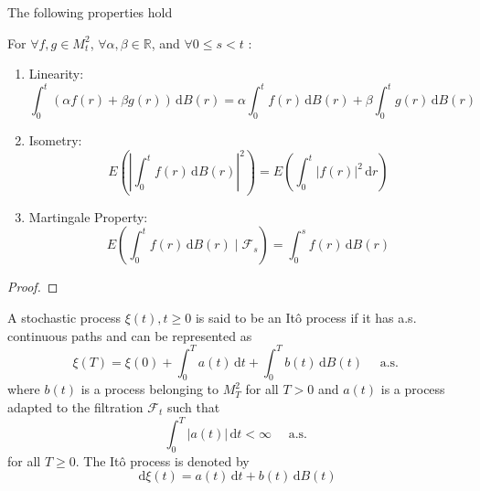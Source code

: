 \begin{definition}

\end{definition}

The following properties hold

\begin{property}
    For $\forall f,g\in M_{t}^{2}$, $\forall\alpha,\beta\in\mathbb{R}$, and $\forall 0\leq s<t$ :
    \begin{enumerate}
        \item Linearity:
              \begin{equation}
                  \int_{0}^{t}(\alpha f(r)+\beta g(r))\,\mathrm{d}B(r)=\alpha \int_{0}^{t}f(r)\,\mathrm{d}B(r)+\beta\int_{0}^{t}g(r)\,\mathrm{d}B(r)
              \end{equation}
        \item Isometry:
              \begin{equation}
                  E\left(\left|\int_{0}^{t}f(r)\,\mathrm{d}B(r)\right|^{2}\right)=E\left(\int_{0}^{t}|f(r)|^{2}\,\mathrm{d}r\right)
              \end{equation}
        \item Martingale Property:
              \begin{equation}
                  E\left(\int_{0}^{t}f(r)\,\mathrm{d}B(r)\mid\mathcal{F}_{s}\right)=\int_{0}^{s}f(r)\,\mathrm{d}B(r)
              \end{equation}
    \end{enumerate}
\end{property}

\begin{proof}

\end{proof}

\begin{definition}
    A stochastic process $\xi(t),t\geq 0$ is said to be an Itô process if it has a.s. continuous paths and can be represented as
    \begin{equation}
        \xi(T)=\xi(0)+\int_{0}^{T}a(t)\,\mathrm{d}t+\int_{0}^{T}b(t)\,\mathrm{d}B(t)\quad\text { a.s. }
    \end{equation}
    where $b(t)$ is a process belonging to $M_{T}^{2}$ for all $T>0$ and $a(t)$ is a process adapted to the filtration $\mathcal{F}_{t}$ such that
    \begin{equation}
        \int_{0}^{T}|a(t)|\,\mathrm{d}t<\infty\quad\text { a.s. } \label{eq:condition-of-process-adapted-to-filtration}
    \end{equation}
    for all $T\geq 0$.
    The Itô process is denoted by
    \begin{equation}
        \mathrm{d}\xi(t)=a(t)\,\mathrm{d}t+b(t)\,\mathrm{d}B(t)
    \end{equation}
\end{definition}


